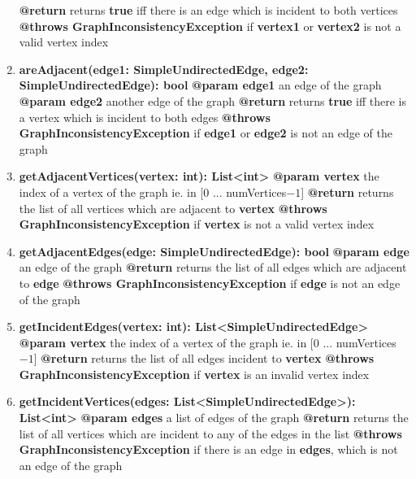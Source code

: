 \begin{enumerate}[+]
{			\textbf{@return} returns \textbf{true} iff there is an edge which is incident to both vertices \newline
			\textbf{@throws GraphInconsistencyException} if \textbf{vertex1} or \textbf{vertex2} is not a valid vertex index
		}
		\item{
			\textbf{areAdjacent(edge1: SimpleUndirectedEdge, edge2: SimpleUndirectedEdge): bool} \newline
			\textbf{@param edge1} an edge of the graph \newline
			\textbf{@param edge2} another edge of the graph \newline
			\textbf{@return} returns \textbf{true} iff there is a vertex which is incident to both edges \newline
			\textbf{@throws GraphInconsistencyException} if \textbf{edge1} or \textbf{edge2} is not an edge of the graph
		}
		\item{
			\textbf{getAdjacentVertices(vertex: int): List<int>} \newline
			\textbf{@param vertex} the index of a vertex of the graph ie. in [0 ... numVertices$-1$] \newline
			\textbf{@return} returns the list of all vertices which are adjacent to \textbf{vertex} \newline
			\textbf{@throws GraphInconsistencyException} if \textbf{vertex} is not a valid vertex index
		}
		\item{
			\textbf{getAdjacentEdges(edge: SimpleUndirectedEdge): bool} \newline
			\textbf{@param edge} an edge of the graph \newline
			\textbf{@return} returns the list of all edges which are adjacent to \textbf{edge} \newline
			\textbf{@throws GraphInconsistencyException} if \textbf{edge} is not an edge of the graph
		}
		\item{
			\textbf{getIncidentEdges(vertex: int): List<SimpleUndirectedEdge>} \newline
			\textbf{@param vertex} the index of a vertex of the graph ie. in [0 ... numVertices$-1$] \newline
			\textbf{@return} returns the list of all edges incident to \textbf{vertex} \newline
			\textbf{@throws GraphInconsistencyException} if \textbf{vertex} is an invalid vertex index
		}
		\item{
			\textbf{getIncidentVertices(edges: List<SimpleUndirectedEdge>): List<int>} \newline
			\textbf{@param edges} a list of edges of the graph \newline
			\textbf{@return} returns the list of all vertices which are incident to any of the edges in the list \newline
			\textbf{@throws GraphInconsistencyException} if there is an edge in \textbf{edges}, which is not an edge of the graph
			
}
\end{enumerate}
